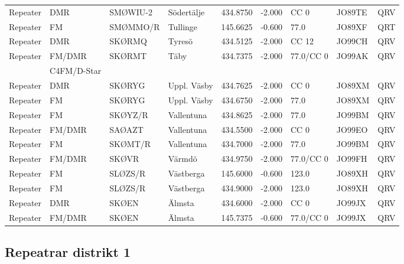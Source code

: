 \begin{longtable}{llllrrlll}
Repeater & DMR         & SMØWIU-2 & Södertälje  & 434.8750     & -2.000     & CC 0       & JO89TE      & QRV      \\
Repeater & FM          & SMØMMO/R & Tullinge    & 145.6625     & -0.600     & 77.0       & JO89XF      & QRT      \\
Repeater & DMR         & SKØRMQ   & Tyresö      & 434.5125     & -2.000     & CC 12      & JO99CH      & QRV      \\
Repeater & FM/DMR      & SKØRMT   & Täby        & 434.7375     & -2.000     & 77.0/CC 0  & JO99AK      & QRV      \\
         & C4FM/D-Star &          &             &              &            &            &             &          \\
Repeater & DMR         & SKØRYG   & Uppl. Väsby & 434.7625     & -2.000     & CC 0       & JO89XM      & QRV      \\
Repeater & FM          & SKØRYG   & Uppl. Väsby & 434.6750     & -2.000     & 77.0       & JO89XM      & QRV      \\
Repeater & FM          & SKØYZ/R  & Vallentuna  & 434.8625     & -2.000     & 77.0       & JO99BM      & QRV      \\
Repeater & FM/DMR      & SAØAZT   & Vallentuna  & 434.5500     & -2.000     & CC 0       & JO99EO      & QRV      \\
Repeater & FM          & SKØMT/R  & Vallentuna  & 434.7000     & -2.000     & 77.0       & JO99BM      & QRV      \\
Repeater & FM/DMR      & SKØVR    & Värmdö      & 434.9750     & -2.000     & 77.0/CC 0  & JO99FH      & QRV      \\
Repeater & FM          & SLØZS/R  & Västberga   & 145.6000     & -0.600     & 123.0      & JO89XH      & QRV      \\
Repeater & FM          & SLØZS/R  & Västberga   & 434.9000     & -2.000     & 123.0      & JO89XH      & QRV      \\
Repeater & DMR         & SKØEN    & Älmsta      & 434.6000     & -2.000     & CC 0       & JO99JX      & QRV      \\
Repeater & FM/DMR      & SKØEN    & Älmsta      & 145.7375     & -0.600     & 77.0/CC 0  & JO99JX      & QRV      \\
\end{longtable}
\normalsize

\clearpage

\subsection{Repeatrar distrikt 1}

